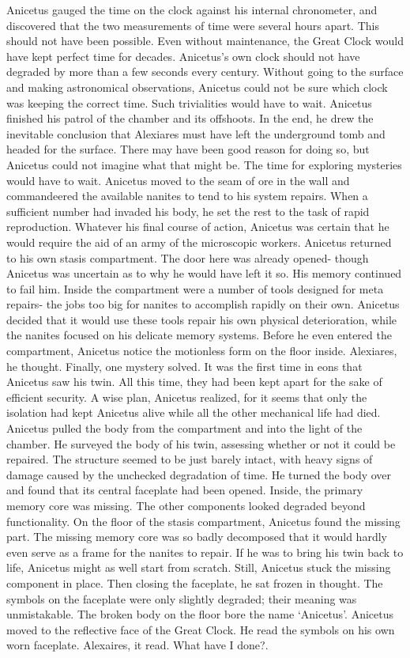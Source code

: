 \documentclass[a4paper]{article}
\begin{document}
Anicetus gauged the time on the clock against his internal chronometer, and discovered that the two measurements of time were several hours apart. This should not have been possible. Even without maintenance, the Great Clock would have kept perfect time for decades. Anicetus’s own clock should not have degraded by more than a few seconds every century. Without going to the surface and making astronomical observations, Anicetus could not be sure which clock was keeping the correct time. Such trivialities would have to wait.
Anicetus finished his patrol of the chamber and its offshoots. In the end, he drew the inevitable conclusion that Alexiares must have left the underground tomb and headed for the surface. There may have been good reason for doing so, but Anicetus could not imagine what that might be.
The time for exploring mysteries would have to wait. Anicetus moved to the seam of ore in the wall and commandeered the available nanites to tend to his system repairs. When a sufficient number had invaded his body, he set the rest to the task of rapid reproduction. Whatever his final course of action, Anicetus was certain that he would require the aid of an army of the microscopic workers.
Anicetus returned to his own stasis compartment. The door here was already opened- though Anicetus was uncertain as to why he would have left it so. His memory continued to fail him.
Inside the compartment were a number of tools designed for meta repairs- the jobs too big for nanites to accomplish rapidly on their own. Anicetus decided that it would use these tools repair his own physical deterioration, while the nanites focused on his delicate memory systems.
Before he even entered the compartment, Anicetus notice the motionless form on the floor inside. Alexiares, he thought. Finally, one mystery solved.
It was the first time in eons that Anicetus saw his twin. All this time, they had been kept apart for the sake of efficient security. A wise plan, Anicetus realized, for it seems that only the isolation had kept Anicetus alive while all the other mechanical life had died.
Anicetus pulled the body from the compartment and into the light of the chamber. He surveyed the body of his twin, assessing whether or not it could be repaired. The structure seemed to be just barely intact, with heavy signs of damage caused by the unchecked degradation of time.
He turned the body over and found that its central faceplate had been opened. Inside, the primary memory core was missing. The other components looked degraded beyond functionality.
On the floor of the stasis compartment, Anicetus found the missing part. The missing memory core was so badly decomposed that it would hardly even serve as a frame for the nanites to repair. If he was to bring his twin back to life, Anicetus might as well start from scratch.
Still, Anicetus stuck the missing component in place. Then closing the faceplate, he sat frozen in thought. The symbols on the faceplate were only slightly degraded; their meaning was unmistakable. The broken body on the floor bore the name ‘Anicetus’.
Anicetus moved to the reflective face of the Great Clock. He read the symbols on his own worn faceplate. Alexaires, it read. What have I done?.
\end{document}
